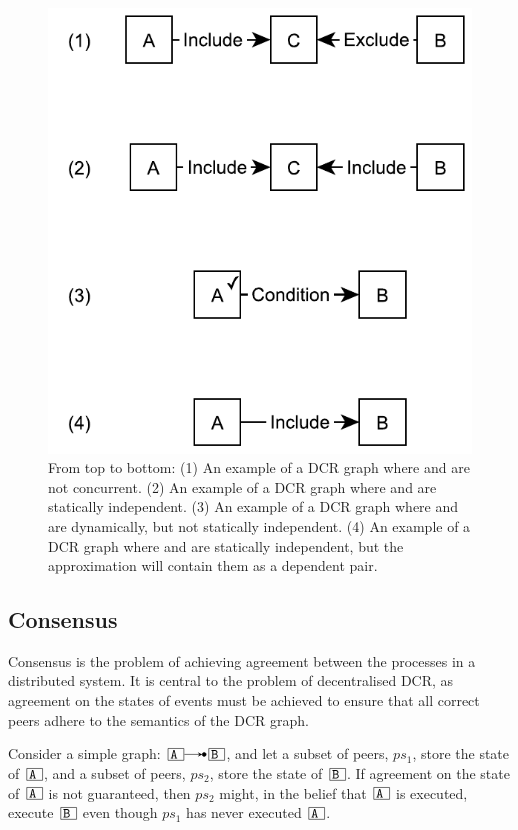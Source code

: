 \documentclass{article}
\begin{document}
			\begin{figure}[ht]
				\center
				\includegraphics[scale=0.6]{figures/dcr-graphs/concurrency-all.pdf}
				\caption{From top to bottom:
				(1) An example of a DCR graph where  and  are not concurrent.
				(2) An example of a DCR graph where  and  are statically independent.
				(3) An example of a DCR graph where  and  are dynamically, but not statically independent.
				(4) An example of a DCR graph where  and  are statically independent, but the approximation will contain them as a dependent pair\label{fig:concurrency-all}.}
			\end{figure}

		\subsection{Consensus}
		\label{subsec:consensus}

		Consensus is the problem of achieving agreement between the processes in a distributed system.
		It is central to the problem of decentralised DCR, as agreement on the states of events must be achieved to ensure that all correct peers adhere to the semantics of the DCR graph.

		Consider a simple graph: $\ev{A} \crel \ev{B}$, and let a subset of peers, $ps_1$, store the state of $\ev{A}$, and a subset of peers, $ps_2$, store the state of $\ev{B}$.
		If agreement on the state of $\ev{A}$ is not guaranteed, then $ps_2$ might, in the belief that $\ev{A}$ is executed, execute $\ev{B}$ even though $ps_1$ has never executed $\ev{A}$.
\end{document}

